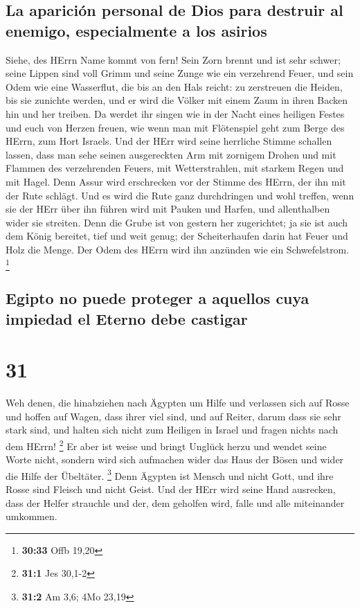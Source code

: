 \hypertarget{la-apariciuxf3n-personal-de-dios-para-destruir-al-enemigo-especialmente-a-los-asirios}{%
\subsection{La aparición personal de Dios para destruir al enemigo,
especialmente a los
asirios}\label{la-apariciuxf3n-personal-de-dios-para-destruir-al-enemigo-especialmente-a-los-asirios}}

 Siehe, des HErrn Name kommt von fern! Sein Zorn brennt
und ist sehr schwer; seine Lippen sind voll Grimm und seine Zunge wie
ein verzehrend Feuer,  und sein Odem wie eine Wasserflut,
die bis an den Hals reicht: zu zerstreuen die Heiden, bis sie zunichte
werden, und er wird die Völker mit einem Zaum in ihren Backen hin und
her treiben.  Da werdet ihr singen wie in der Nacht eines
heiligen Festes und euch von Herzen freuen, wie wenn man mit Flötenspiel
geht zum Berge des HErrn, zum Hort Israels.  Und der HErr
wird seine herrliche Stimme schallen lassen, dass man sehe seinen
ausgereckten Arm mit zornigem Drohen und mit Flammen des verzehrenden
Feuers, mit Wetterstrahlen, mit starkem Regen und mit Hagel.
 Denn Assur wird erschrecken vor der Stimme des HErrn,
der ihn mit der Rute schlägt.  Und es wird die Rute ganz
durchdringen und wohl treffen, wenn sie der HErr über ihn führen wird
mit Pauken und Harfen, und allenthalben wider sie streiten.
 Denn die Grube ist von gestern her zugerichtet; ja sie
ist auch dem König bereitet, tief und weit genug; der Scheiterhaufen
darin hat Feuer und Holz die Menge. Der Odem des HErrn wird ihn anzünden
wie ein Schwefelstrom. \footnote{\textbf{30:33} Offb 19,20}

\hypertarget{egipto-no-puede-proteger-a-aquellos-cuya-impiedad-el-eterno-debe-castigar}{%
\subsection{Egipto no puede proteger a aquellos cuya impiedad el Eterno
debe
castigar}\label{egipto-no-puede-proteger-a-aquellos-cuya-impiedad-el-eterno-debe-castigar}}

\hypertarget{section-30}{%
\section{31}\label{section-30}}

 Weh denen, die hinabziehen nach Ägypten um Hilfe und
verlassen sich auf Rosse und hoffen auf Wagen, dass ihrer viel sind, und
auf Reiter, darum dass sie sehr stark sind, und halten sich nicht zum
Heiligen in Israel und fragen nichts nach dem HErrn! \footnote{\textbf{31:1}
  Jes 30,1-2}  Er aber ist weise und bringt Unglück herzu
und wendet seine Worte nicht, sondern wird sich aufmachen wider das Haus
der Bösen und wider die Hilfe der Übeltäter. \footnote{\textbf{31:2} Am
  3,6; 4Mo 23,19}  Denn Ägypten ist Mensch und nicht Gott,
und ihre Rosse sind Fleisch und nicht Geist. Und der HErr wird seine
Hand ausrecken, dass der Helfer strauchle und der, dem geholfen wird,
falle und alle miteinander umkommen.

